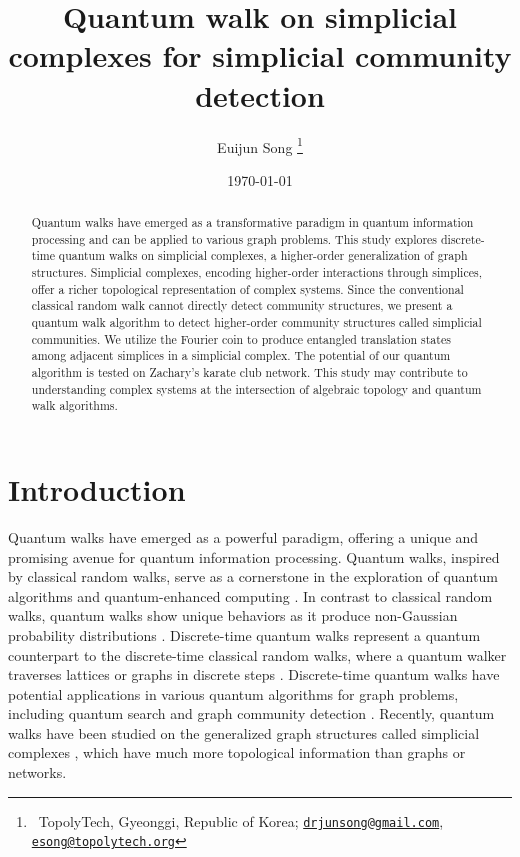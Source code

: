 \documentclass[10pt, letterpaper]{article}
\title{Quantum walk on simplicial complexes for simplicial community detection}
\author{Euijun Song \orcidlink{0000-0002-5886-4210}\thanks{~TopolyTech, Gyeonggi, Republic of Korea; \href{mailto:drjunsong@gmail.com}{\texttt{drjunsong@gmail.com}}, \href{mailto:esong@topolytech.org}{\texttt{esong@topolytech.org}}}}
\date{\today}
\begin{document}
\maketitle

\begin{abstract}
Quantum walks have emerged as a transformative paradigm in quantum information processing and can be applied to various graph problems. This study explores discrete-time quantum walks on simplicial complexes, a higher-order generalization of graph structures. Simplicial complexes, encoding higher-order interactions through simplices, offer a richer topological representation of complex systems. Since the conventional classical random walk cannot directly detect community structures, we present a quantum walk algorithm to detect higher-order community structures called simplicial communities. We utilize the Fourier coin to produce entangled translation states among adjacent simplices in a simplicial complex. The potential of our quantum algorithm is tested on Zachary's karate club network. This study may contribute to understanding complex systems at the intersection of algebraic topology and quantum walk algorithms.
\end{abstract}


\medskip

\section{Introduction}

Quantum walks have emerged as a powerful paradigm, offering a unique and promising avenue for quantum information processing. Quantum walks, inspired by classical random walks, serve as a cornerstone in the exploration of quantum algorithms and quantum-enhanced computing \cite{Aharonov1993, Travaglione2002}. In contrast to classical random walks, quantum walks show unique behaviors as it produce non-Gaussian probability distributions \cite{Konno2002, Konno2005}. Discrete-time quantum walks represent a quantum counterpart to the discrete-time classical random walks, where a quantum walker traverses lattices or graphs in discrete steps \cite{Aharonov1993}. Discrete-time quantum walks have potential applications in various quantum algorithms for graph problems, including quantum search \cite{Berry2010, Grover1996} and graph community detection \cite{Mukai2020}. Recently, quantum walks have been studied on the generalized graph structures called simplicial complexes \cite{Matsue2016, Matsue2018}, which have much more topological information than graphs or networks.
\end{document}
